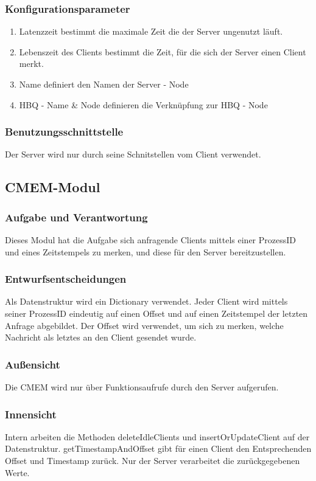 \documentclass{article}
\begin{document}
\subsubsection{Konfigurationsparameter}
\begin{enumerate}
    \item{Latenzzeit bestimmt die maximale Zeit die der Server ungenutzt läuft.}
    \item{Lebenszeit des Clients bestimmt die Zeit, für die sich der Server einen Client merkt.}
    \item{Name definiert den Namen der Server - Node}
    \item{HBQ - Name \& Node definieren die Verknüpfung zur HBQ - Node}
\end{enumerate}

\subsubsection{Benutzungsschnittstelle}
Der Server wird nur durch seine Schnitstellen vom Client verwendet.
\newpage

\subsection{CMEM-Modul}
\subsubsection{Aufgabe und Verantwortung}
Dieses Modul hat die Aufgabe sich anfragende Clients mittels einer ProzessID und eines Zeitstempels zu merken, und diese für den Server bereitzustellen.

\subsubsection{Entwurfsentscheidungen}
Als Datenstruktur wird ein Dictionary verwendet. Jeder Client wird mittels seiner ProzessID eindeutig auf einen Offset und auf einen Zeitstempel der letzten Anfrage abgebildet. Der Offset wird verwendet, um sich zu merken, welche Nachricht als letztes an den Client gesendet wurde.

\subsubsection{Außensicht}
Die CMEM wird nur über Funktionsaufrufe durch den Server aufgerufen.

\subsubsection{Innensicht}
Intern arbeiten die Methoden deleteIdleClients und insertOrUpdateClient auf der Datenstruktur. getTimestampAndOffset gibt für einen Client den Entsprechenden Offset und Timestamp zurück. Nur der Server verarbeitet die zurückgegebenen Werte.
\end{document}
